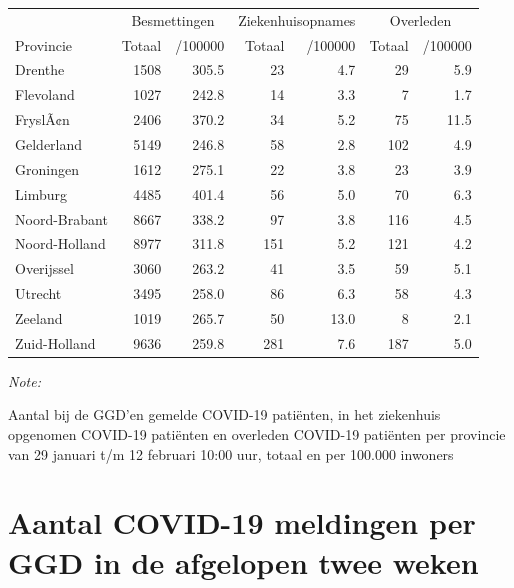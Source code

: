 \documentclass[
  english,
  man,floatsintext]{apa6}
\begin{document}
\begin{table}[H]
\centering
\begin{threeparttable}
\begin{tabular}{lrrrrrr}
\toprule
\multicolumn{1}{c}{ } & \multicolumn{2}{c}{Besmettingen} & \multicolumn{2}{c}{Ziekenhuisopnames} & \multicolumn{2}{c}{Overleden} \\
\cmidrule(l{3pt}r{3pt}){2-3} \cmidrule(l{3pt}r{3pt}){4-5} \cmidrule(l{3pt}r{3pt}){6-7}
Provincie & Totaal & /100000 & Totaal & /100000 & Totaal & /100000\\
\midrule
Drenthe & 1508 & 305.5 & 23 & 4.7 & 29 & 5.9\\
Flevoland & 1027 & 242.8 & 14 & 3.3 & 7 & 1.7\\
FryslÃ¢n & 2406 & 370.2 & 34 & 5.2 & 75 & 11.5\\
Gelderland & 5149 & 246.8 & 58 & 2.8 & 102 & 4.9\\
Groningen & 1612 & 275.1 & 22 & 3.8 & 23 & 3.9\\
Limburg & 4485 & 401.4 & 56 & 5.0 & 70 & 6.3\\
Noord-Brabant & 8667 & 338.2 & 97 & 3.8 & 116 & 4.5\\
Noord-Holland & 8977 & 311.8 & 151 & 5.2 & 121 & 4.2\\
Overijssel & 3060 & 263.2 & 41 & 3.5 & 59 & 5.1\\
Utrecht & 3495 & 258.0 & 86 & 6.3 & 58 & 4.3\\
Zeeland & 1019 & 265.7 & 50 & 13.0 & 8 & 2.1\\
Zuid-Holland & 9636 & 259.8 & 281 & 7.6 & 187 & 5.0\\
\bottomrule
\end{tabular}
\begin{tablenotes}
\item \textit{Note: } 
\item Aantal bij de GGD’en gemelde COVID-19 patiënten, in het ziekenhuis opgenomen COVID-19 patiënten en overleden COVID-19 patiënten per provincie van 29 januari t/m 12 februari 10:00 uur, totaal en per 100.000 inwoners
\end{tablenotes}
\end{threeparttable}
\end{table}

\newpage

\hypertarget{aantal-covid-19-meldingen-per-ggd-in-de-afgelopen-twee-weken}{%
\section{Aantal COVID-19 meldingen per GGD in de afgelopen twee weken}\label{aantal-covid-19-meldingen-per-ggd-in-de-afgelopen-twee-weken}}
\end{document}
